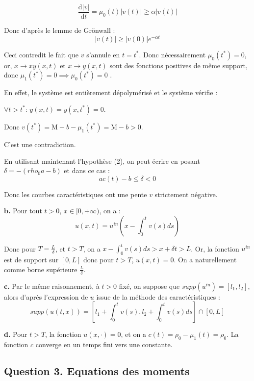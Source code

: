 \documentclass[a4paper]{article}
\newcommand{\mass}{\mathrm{M}}
\newcommand{\dep}{b}
\begin{document}
	\[ \frac{\mathrm{d} |v| }{\mathrm{d}t} = \mu_0(t)|v(t)| \geq \alpha |v(t)| \]
	
	Donc d'après le lemme de Grönwall :
	\[ |v(t)| \geq |v(0)| e^{-\alpha t} \]
	
	Ceci contredit le fait que $v$ s'annule en $t=t^*$.
	Donc nécessairement $\mu_0(t^*) = 0$, 
	or, $x \to xy (x,t)$ et $x \to y(x,t)$ sont des fonctions positives de même support,
	donc $\mu_1(t^*) =0 \implies \mu_0(t^*)=0$ .
	
	En effet, le système est entièrement dépolymérisé et le système vérifie :
	
	$\forall t>t^*$:  $y(x,t)=y(x,t^*)= 0$.
	
	Donc $v(t^*) = \mass - \dep - \mu_1(t^*) = \mass- \dep > 0$.
	
	C'est une contradiction.	

En utilisant maintenant l'hypothèse (2), on peut écrire 
en posant $\delta = -(rho_0 a -b) $ et dans ce cas :
\[ ac(t)-b \leq \delta <0 \] 

Donc les courbes caractéristiques ont une pente $v$ strictement négative.

\textbf{b.}
Pour tout $t>0$, $x \in[0,+\infty)$, on a :
\[ u(x,t) = u^{in}(x- \int_0^t v(s)ds) \]

Donc pour $T = \displaystyle \frac{L}{\delta}$, et $t>T$, on a $x- \int_0^t v(s)ds > x+\delta t >L $. Or, la fonction $u^{in}$ est de support sur $[0,L]$ 
donc pour $t>T$, $u(x,t)=0$.
On a naturellement comme borne supérieure $\displaystyle \frac{L}{\delta}$.

\textbf{c.}
Par le même raisonnement, à $t>0$ fixé, 
on suppose que $supp(u^{in})= [l_1,l_2]$,
alors  d'après l'expression de $u$ issue de la méthode des caractéristiques :
\[supp (u(t,x)) = [l_1 + \int_0^t v(s) , l_2 + \int_0^t v(s) ds] \cap [0,L]\] 

\textbf{d.}
Pour $t>T$, la fonction $u(x, \cdot)=0$, 
et on a $c(t) = \rho_0 - \mu_1(t) = \rho_0$.
La fonction $c$ converge en un temps fini vers une constante.




\subsection*{Question 3. Equations des moments}
\end{document}
